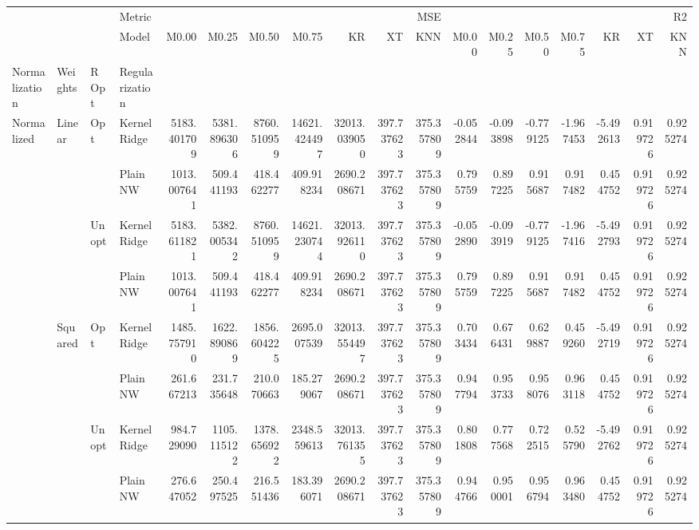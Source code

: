 \begin{tabular}{llllrrrrrrrrrrrrrr}
\toprule
 &  &  & Metric & \multicolumn{7}{r}{MSE} & \multicolumn{7}{r}{R2} \\
 &  &  & Model & M0.00 & M0.25 & M0.50 & M0.75 & KR & XT & KNN & M0.00 & M0.25 & M0.50 & M0.75 & KR & XT & KNN \\
Normalization & Weights & R Opt & Regularization &  &  &  &  &  &  &  &  &  &  &  &  &  &  \\
\midrule
\multirow[t]{8}{*}{Normalized} & \multirow[t]{4}{*}{Linear} & \multirow[t]{2}{*}{Opt} & KernelRidge & 5183.401709 & 5381.896306 & 8760.510959 & 14621.424497 & 32013.039050 & 397.737623 & 375.357809 & -0.052844 & -0.093898 & -0.779125 & -1.967453 & -5.492613 & 0.919726 & 0.925274 \\
 &  &  & Plain NW & 1013.007641 & 509.441193 & 418.462277 & 409.918234 & 2690.208671 & 397.737623 & 375.357809 & 0.795759 & 0.897225 & 0.915687 & 0.917482 & 0.454752 & 0.919726 & 0.925274 \\
\cline{3-18}
 &  & \multirow[t]{2}{*}{Unopt} & KernelRidge & 5183.611821 & 5382.005342 & 8760.510959 & 14621.230744 & 32013.926110 & 397.737623 & 375.357809 & -0.052890 & -0.093919 & -0.779125 & -1.967416 & -5.492793 & 0.919726 & 0.925274 \\
 &  &  & Plain NW & 1013.007641 & 509.441193 & 418.462277 & 409.918234 & 2690.208671 & 397.737623 & 375.357809 & 0.795759 & 0.897225 & 0.915687 & 0.917482 & 0.454752 & 0.919726 & 0.925274 \\
\cline{2-18} \cline{3-18}
 & \multirow[t]{4}{*}{Squared} & \multirow[t]{2}{*}{Opt} & KernelRidge & 1485.757910 & 1622.890869 & 1856.604225 & 2695.007539 & 32013.554497 & 397.737623 & 375.357809 & 0.703434 & 0.676431 & 0.629887 & 0.459260 & -5.492719 & 0.919726 & 0.925274 \\
 &  &  & Plain NW & 261.667213 & 231.735648 & 210.070663 & 185.279067 & 2690.208671 & 397.737623 & 375.357809 & 0.947794 & 0.953733 & 0.958076 & 0.963118 & 0.454752 & 0.919726 & 0.925274 \\
\cline{3-18}
 &  & \multirow[t]{2}{*}{Unopt} & KernelRidge & 984.729090 & 1105.115122 & 1378.656922 & 2348.559613 & 32013.761355 & 397.737623 & 375.357809 & 0.801808 & 0.777568 & 0.722515 & 0.525790 & -5.492762 & 0.919726 & 0.925274 \\
 &  &  & Plain NW & 276.647052 & 250.497525 & 216.551436 & 183.396071 & 2690.208671 & 397.737623 & 375.357809 & 0.944766 & 0.950001 & 0.956794 & 0.963480 & 0.454752 & 0.919726 & 0.925274 \\
\cline{1-18} \cline{2-18} \cline{3-18}
\bottomrule
\end{tabular}
